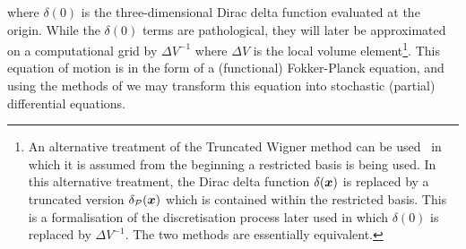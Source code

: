 where $\delta(0)$ is the three-dimensional Dirac delta function evaluated at the origin. While the $\delta(0)$ terms are pathological, they will later be approximated on a computational grid by $\Delta V^{-1}$ where $\Delta V$ is the local volume element\footnote{An alternative treatment of the Truncated Wigner method can be used~\citep{Norrie:2006vn,Norrie:2006kx} in which it is assumed from the beginning a restricted basis is being used.  In this alternative treatment, the Dirac delta function $\delta(\bm{x})$ is replaced by a truncated version $\delta_\mathcal{P}(\bm{x})$ which is contained within the restricted basis. This is a formalisation of the discretisation process later used in which $\delta(0)$ is replaced by $\Delta V^{-1}$.  The two methods are essentially equivalent.}.  This equation of motion is in the form of a (functional) Fokker-Planck equation, and using the methods of  we may transform this equation into stochastic (partial) differential equations.

